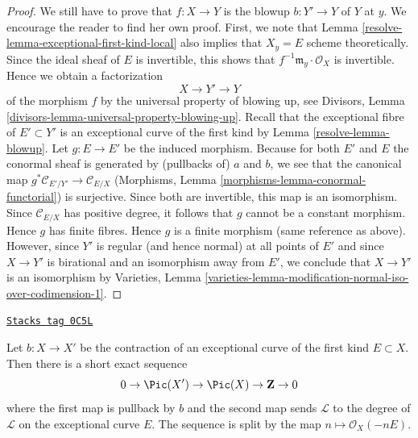 \begin{proof}
\medskip\noindent
We still have to prove that $f : X \to Y$ is the blowup $b : Y' \to Y$
of $Y$ at $y$. We encourage the reader to find her own proof.
First, we note that Lemma \ref{resolve-lemma-exceptional-first-kind-local}
also implies that $X_y = E$ scheme theoretically.
Since the ideal sheaf of $E$ is invertible, this shows
that $f^{-1}\mathfrak m_y \cdot \mathcal{O}_X$ is invertible.
Hence we obtain a factorization
$$
X \to Y' \to Y
$$
of the morphism $f$ by the universal property of blowing up, see
Divisors, Lemma \ref{divisors-lemma-universal-property-blowing-up}.
Recall that the exceptional fibre of $E' \subset Y'$ is an exceptional
curve of the first kind by Lemma \ref{resolve-lemma-blowup}.
Let $g : E \to E'$ be the induced morphism.
Because for both $E'$ and $E$ the conormal sheaf is generated
by (pullbacks of) $a$ and $b$, we see that the canonical map
$g^*\mathcal{C}_{E'/Y'} \to \mathcal{C}_{E/X}$
(Morphisms, Lemma \ref{morphisms-lemma-conormal-functorial})
is surjective. Since both are invertible, this map is an isomorphism.
Since $\mathcal{C}_{E/X}$ has positive degree, it follows that $g$
cannot be a constant morphism.
Hence $g$ has finite fibres. Hence $g$ is a finite morphism
(same reference as above). However, since $Y'$ is regular
(and hence normal) at all points of $E'$ and since $X \to Y'$
is birational and an isomorphism away from $E'$, we conclude
that $X \to Y'$ is an isomorphism by
Varieties, Lemma
\ref{varieties-lemma-modification-normal-iso-over-codimension-1}.
\end{proof}

\begin{lemma}
\label{resolve-lemma-pic-blowup}
\href{https://stacks.math.columbia.edu/tag/0C5L}{\texttt{Stacks tag 0C5L}}

Let $b : X \to X'$ be the contraction of an
exceptional curve of the first kind $E \subset X$.
Then there is a short exact sequence
$$
0 \to \Pic(X') \to \Pic(X) \to \mathbf{Z} \to 0
$$
where the first map is pullback by $b$ and the second map sends
$\mathcal{L}$ to the degree of $\mathcal{L}$ on the exceptional
curve $E$. The sequence is split by the map
$n \mapsto \mathcal{O}_X(-nE)$.
\end{lemma}

